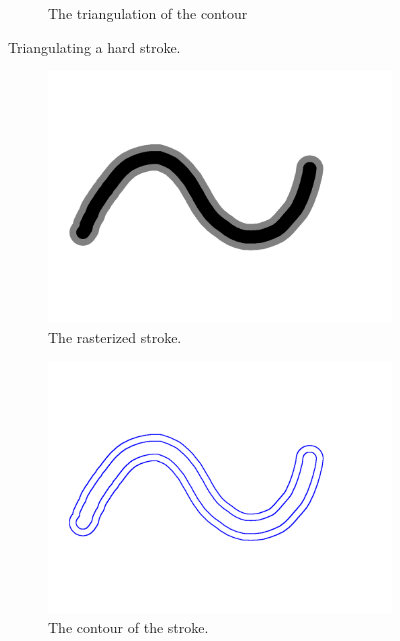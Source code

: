 \documentclass[conference]{acmsiggraph}
\begin{document}
\begin{figure}
\begin{subfigure}[b]{0.3\textwidth}
  \caption{The triangulation of the contour}
  \label{fig:sub2}
\end{subfigure}
\caption{Triangulating a hard stroke.}
\label{fig:test}
\end{figure}

\begin{figure}
\centering
\begin{subfigure}[b]{0.3\textwidth}
  \centering
  \includegraphics[width=.9\textwidth]{images/stroke_triangulation/softrendered}
  \caption{The rasterized stroke.}
  \label{fig:sub1}
\end{subfigure}%
\begin{subfigure}[b]{0.3\textwidth}
  \centering
  \includegraphics[width=.9\textwidth]{images/stroke_triangulation/softpruned}
  \caption{The contour of the stroke.}
  \label{fig:sub2}
\end{subfigure}
\begin{subfigure}[b]{0.3\textwidth}

\end{subfigure}
\end{figure}
\end{document}
